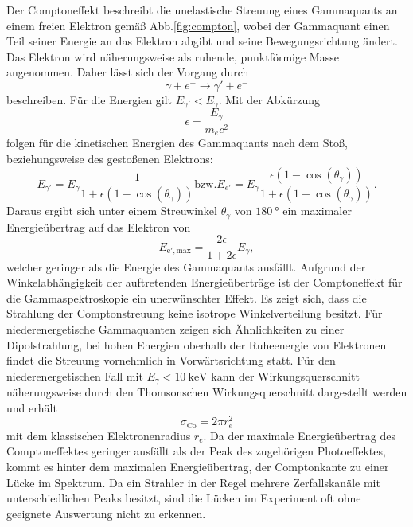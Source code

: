 Der Comptoneffekt beschreibt die unelastische Streuung eines Gammaquants an einem freien Elektron gemäß Abb.\ref{fig:compton}, wobei der Gammaquant einen Teil seiner Energie an das Elektron abgibt und seine Bewegungsrichtung ändert. Das Elektron wird näherungsweise als ruhende, punktförmige Masse angenommen. Daher lässt sich der Vorgang durch
\begin{equation}
    \gamma + e^- \to \gamma' + e^-
\end{equation}
beschreiben. Für die Energien gilt $E_{\gamma'} < E_\gamma$.
Mit der Abkürzung
\begin{equation}
    \epsilon = \frac{E_\gamma}{m_e c^2} \label{eq:eps}
\end{equation}
folgen für die kinetischen Energien des Gammaquants nach dem Stoß, beziehungsweise des gestoßenen Elektrons:
\begin{equation}
    E_{\gamma'} =  E_\gamma \frac{1}{1+ \epsilon (1-\cos(\theta_\gamma))} \text{bzw.} E_{e'} =  E_\gamma \frac{\epsilon (1-\cos(\theta_\gamma))}{1+ \epsilon (1-\cos(\theta_\gamma))} . \label{eq:ecomp}
\end{equation}
Daraus ergibt sich unter einem Streuwinkel $\theta_\gamma$ von $\SI{180}{\degree}$ ein maximaler Energieübertrag auf das Elektron von
\begin{equation}
    E_{\text{e}',\text{max}} = \frac{2 \epsilon}{1 + 2 \epsilon} E_\gamma , \label{eq:emaxcomp}
\end{equation}
welcher geringer als die Energie des Gammaquants ausfällt. %
Aufgrund der Winkelabhängigkeit der auftretenden Energieüberträge ist der Comptoneffekt für die Gammaspektroskopie ein unerwünschter Effekt. Es zeigt sich, dass die Strahlung der Comptonstreuung keine isotrope Winkelverteilung besitzt. Für niederenergetische Gammaquanten zeigen sich Ähnlichkeiten zu einer Dipolstrahlung, bei hohen Energien oberhalb der Ruheenergie von Elektronen findet die Streuung vornehmlich in Vorwärtsrichtung statt. Für den niederenergetischen Fall mit $E_\gamma < \SI{10}{\kilo\electronvolt}$ kann der Wirkungsquerschnitt näherungsweise durch den Thomsonschen Wirkungsquerschnitt dargestellt werden und erhält
\begin{equation}
    \sigma_\text{Co} = 2 \pi r_e^2
\end{equation}
mit dem klassischen Elektronenradius $r_e$. Da der maximale Energieübertrag des Comptoneffektes geringer ausfällt als der Peak des zugehörigen Photoeffektes, kommt es hinter dem maximalen Energieübertrag, der Comptonkante zu einer Lücke im Spektrum. Da ein Strahler in der Regel mehrere Zerfallskanäle mit unterschiedlichen Peaks besitzt, sind die Lücken im Experiment oft ohne geeignete Auswertung nicht zu erkennen.%

